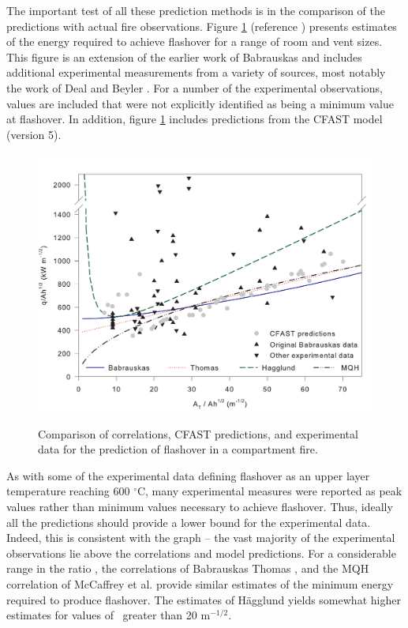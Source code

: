 The important test of all these prediction methods is in the comparison of the predictions with actual fire observations. Figure \ref{figValidFlashover} (reference \cite{Valid:Peacock_Flashover_2}) presents estimates of the energy required to achieve flashover for a range of room and vent sizes. This figure is an extension of the earlier work of Babrauskas  \cite{Valid:Babrauskas_Flashover} and includes additional experimental measurements from a variety of sources, most notably the work of Deal and Beyler \cite{Valid:DealandBeyler}. For a number of the experimental observations, values are included that were not explicitly identified as being a minimum value at flashover. In addition, figure \ref{figValidFlashover} includes predictions from the CFAST model (version 5).

\begin{figure}[\figoptions{b}]
\begin{center}
\includegraphics[width=5.0000in]{FIGURES/flashover.pdf}\\
\end{center}
\caption{Comparison of correlations, CFAST predictions, and experimental data for the prediction of flashover in a compartment fire.}
 \label{figValidFlashover}
\end{figure}

As with some of the experimental data defining flashover as an upper layer temperature reaching 600 $^{\circ}$C, many experimental measures were reported as peak values rather than minimum values necessary to achieve flashover. Thus, ideally all the predictions should provide a lower bound for the experimental data. Indeed, this is consistent with the graph -- the vast majority of the experimental observations lie above the correlations and model predictions. For a considerable range in the ratio \asqh, the correlations of Babrauskas \cite{Valid:Babrauskas_Flashover} Thomas \cite{Thomas:1981fk}, and the MQH correlation of McCaffrey et al. \cite{McCaffrey:1981uq} provide similar estimates of the minimum energy required to produce flashover. The estimates of H\"{a}gglund \cite{Hagglund:1980} yields somewhat higher estimates for values of \asqh  \, greater than 20 m$^{-1/2}$.

